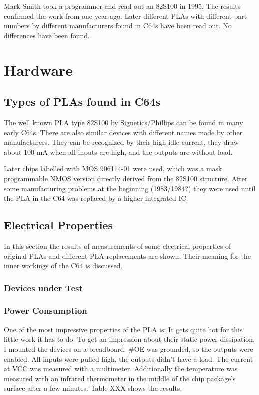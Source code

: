\documentclass[a4paper,oneside]{memoir}
\begin{document}
Mark Smith took a programmer and read out an 82S100 in 1995. The
results confirmed the work from one year ago. Later different PLAs
with different part numbers by different manufacturers found in C64s
have been read out. No differences have been found.

\chapter{Hardware}
\section{Types of PLAs found in C64s}

The well known PLA type 82S100 by Signetics/Phillips can be found in
many early C64s. There are also similar devices with different names
made by other manufacturers. They can be recognized by their high
idle current, they draw about 100 mA when all inputs are high, and
the outputs are without load.

Later chips labelled with MOS 906114-01 were used, which was a mask
programmable NMOS version directly derived from the 82S100
structure. After some manufacturing problems at the beginning
(1983/1984?) they were used until the PLA in the C64 was replaced by
a higher integrated IC.

\section{Electrical Properties}

In this section the results of measurements of some electrical properties of
original PLAs and different PLA replacements are shown. Their meaning for
the inner workings of the C64 is discussed.

\subsection{Devices under Test}

\subsection{Power Consumption}

One of the most impressive properties of the PLA is: It gets quite hot for
this little work it has to do. To get an impression about their static power
dissipation, I mounted the devices on a breadboard. \#OE was grounded, so
the outputs were enabled. All inputs were pulled high, the outputs didn't
have a load. The current at VCC was measured with a multimeter. Additionally
the temperature was measured with an infrared thermometer in the middle of
the chip package's surface after a few minutes. Table XXX shows the results.
\end{document}
